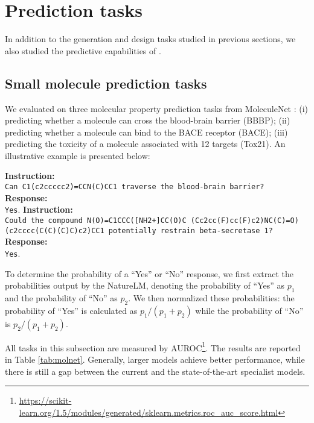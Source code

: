 \section{Prediction tasks}
In addition to the generation and design tasks studied in previous sections, we also studied the predictive capabilities of \ourM{}. 

\subsection{Small molecule prediction tasks}
We evaluated \ourM{} on three molecular property prediction tasks from MoleculeNet \cite{moleculenetpaper}: (i) predicting whether a molecule can cross the blood-brain barrier (BBBP); (ii) predicting whether a molecule can bind to the BACE receptor (BACE); (iii) predicting the toxicity of a molecule associated with 12 targets (Tox21). An illustrative example is presented below:

\begin{example}
\textbf{Instruction:}\\
\texttt{Can \mol{}C1(c2ccccc2)=CCN(C)CC1\emol{} traverse the blood-brain barrier?}\\ %
\textbf{Response:} \\
\texttt{Yes}.
\newline
\newline
\noindent\textbf{Instruction:} \\
\texttt{Could the compound \mol{}N(O)=C1CCC([NH2+]CC(O)C
\noindent(Cc2cc(F)cc(F)c2)NC(C)=O)(c2cccc(C(C)(C)C)c2)CC1\emol{} potentially restrain beta-secretase 1?}\\%
\textbf{Response:} \\
\texttt{Yes}. 
\end{example}

To determine the probability of a ``Yes'' or ``No'' response, we first extract the probabilities output by the NatureLM, denoting the probability of ``Yes'' as $p_1$ and the probability of ``No'' as $p_2$. We then normalized these probabilities: the probability of ``Yes'' is calculated as $p_1/(p_1+p_2)$ while the probability of ``No'' is $p_2/(p_1+p_2)$. 

All tasks in this subsection are measured by AUROC\footnote{\url{https://scikit-learn.org/1.5/modules/generated/sklearn.metrics.roc_auc_score.html}}. The results are reported in Table \ref{tab:molnet}. Generally, larger models achieve better performance, while there is still a gap between the current \ourM{} and the state-of-the-art specialist models. 

